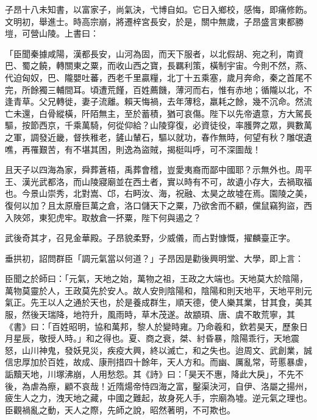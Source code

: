\begin{pinyinscope}
 子昂十八未知書，以富家子，尚氣決，弋博自如。它日入鄉校，感悔，即痛修飭。文明初，舉進士。時高宗崩，將遷梓宮長安，於是，關中無歲，子昂盛言東都勝塏，可營山陵。上書曰：



 「臣聞秦據咸陽，漢都長安，山河為固，而天下服者，以北假胡、宛之利，南資巴、蜀之饒，轉關東之粟，而收山西之寶，長羈利策，橫制宇宙。今則不然，燕、代迫匈奴，巴、隴嬰吐蕃，西老千里贏糧，北丁十五乘塞，歲月奔命，秦之首尾不完，所餘獨三輔間耳。頃遭荒饉，百姓薦饑，薄河而右，惟有赤地；循隴以北，不逢青草。父兄轉徙，妻子流離。賴天悔禍，去年薄稔，羸耗之餘，幾不沉命。然流亡未還，白骨縱橫，阡陌無主，至於蓄積，猶可哀傷。陛下以先帝遺意，方大駕長驅，按節西京，千乘萬騎，何從仰給？山陵穿復，必資徒役，率臒弊之眾，興數萬之軍，調發近畿，督抶稚老，鏟山輦石，驅以就功，春作無時，何望有秋？雕氓遺噍，再罹艱苦，有不堪其困，則逸為盜賊，揭梃叫呼，可不深圖哉！



 且天子以四海為家，舜葬蒼梧，禹葬會稽，豈愛夷裔而鄙中國耶？示無外也。周平王、漢光武都洛，而山陵寢廟並在西土者，實以時有不可，故遺小存大，去禍取福也。今景山崇秀，北對嵩、邙，右眄汝、海，祝融、太昊之故墟在焉。園陵之美，復何以加？且太原廥巨萬之倉，洛口儲天下之粟，乃欲舍而不顧，儻鼠竊狗盜，西入陜郊，東犯虎牢。取敖倉一抔粟，陛下何與遏之？



 武後奇其才，召見金華殿。子昂貌柔野，少威儀，而占對慷慨，擢麟臺正字。



 垂拱初，詔問群臣「調元氣當以何道？」子昂因是勸後興明堂、大學，即上言：



 臣聞之於師曰：「元氣，天地之始，萬物之祖，王政之大端也。天地莫大於陰陽，萬物莫靈於人，王政莫先於安人。故人安則陰陽和，陰陽和則天地平，天地平則元氣正。先王以人之通於天也，於是養成群生，順天德，使人樂其業，甘其食，美其服，然後天瑞降，地符升，風雨時，草木茂遂。故顓頊、唐、虞不敢荒寧，其《書》曰：「百姓昭明，協和萬邦，黎人於變時雍。乃命羲和，欽若昊天，歷象日月星辰，敬授人時。」和之得也。夏、商之衰，桀、紂昏暴，陰陽乖行，天地震怒，山川神鬼，發妖見災，疾疫大興，終以滅亡，和之失也。迨周文、武創業，誠信忠厚加於百姓，故成、康刑措四十餘年，天人方和。而幽、厲亂常，苛慝暴虐，詬黷天地，川塚沸崩，人用愁怨。其《詩》曰：「昊天不惠，降此大戾」，不先不後，為虐為瘵，顧不哀哉！近隋煬帝恃四海之富，鑿渠決河，自伊、洛屬之揚州，疲生人之力，洩天地之藏，中國之難起，故身死人手，宗廟為墟。逆元氣之理也。臣觀禍亂之動，天人之際，先師之說，昭然著明，不可欺也。




\end{pinyinscope}

